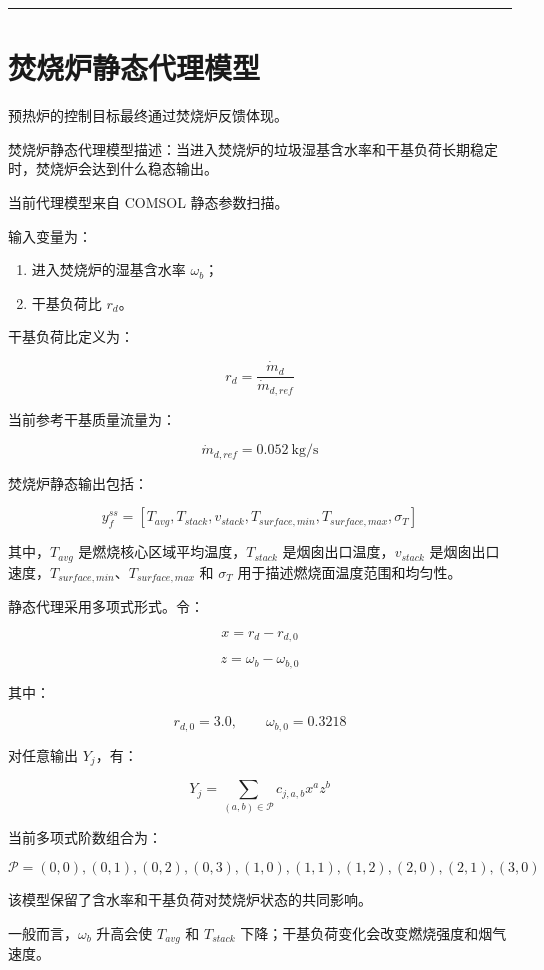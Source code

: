 \documentclass[UTF8,openany,zihao=-4,oneside]{ctexbook}
\providecommand{\tightlist}{\setlength{\itemsep}{0pt}\setlength{\parskip}{0pt}}
\newcommand{\manualdivider}{\par\vspace{0.6em}\noindent\textcolor{FGLine}{\rule{\linewidth}{0.7pt}}\vspace{0.6em}\par}
\begin{document}
\manualdivider

\section{焚烧炉静态代理模型}\label{ux711aux70e7ux7089ux9759ux6001ux4ee3ux7406ux6a21ux578b}

预热炉的控制目标最终通过焚烧炉反馈体现。

焚烧炉静态代理模型描述：当进入焚烧炉的垃圾湿基含水率和干基负荷长期稳定时，焚烧炉会达到什么稳态输出。

当前代理模型来自 COMSOL 静态参数扫描。

输入变量为：

\begin{enumerate}
\def\labelenumi{\arabic{enumi}.}
\tightlist
\item
  进入焚烧炉的湿基含水率 \(\omega_b\)；
\item
  干基负荷比 \(r_d\)。
\end{enumerate}

干基负荷比定义为：

\[
r_d=\frac{\dot m_d}{\dot m_{d,ref}}
\]

当前参考干基质量流量为：

\[
\dot m_{d,ref}=0.052\ \mathrm{kg/s}
\]

焚烧炉静态输出包括：

\[
y_f^{ss}=\left[T_{avg},T_{stack},v_{stack},T_{surface,min},T_{surface,max},\sigma_T\right]
\]

其中，\(T_{avg}\) 是燃烧核心区域平均温度，\(T_{stack}\) 是烟囱出口温度，\(v_{stack}\) 是烟囱出口速度，\(T_{surface,min}\)、\(T_{surface,max}\) 和 \(\sigma_T\) 用于描述燃烧面温度范围和均匀性。

静态代理采用多项式形式。令：

\[
x=r_d-r_{d,0}
\]

\[
z=\omega_b-\omega_{b,0}
\]

其中：

\[
r_{d,0}=3.0,
\qquad \omega_{b,0}=0.3218
\]

对任意输出 \(Y_j\)，有：

\[
Y_j=\sum_{(a,b)\in\mathcal P}c_{j,a,b}x^az^b
\]

当前多项式阶数组合为：

\[
\mathcal P={(0,0),(0,1),(0,2),(0,3),(1,0),(1,1),(1,2),(2,0),(2,1),(3,0)}
\]

该模型保留了含水率和干基负荷对焚烧炉状态的共同影响。

一般而言，\(\omega_b\) 升高会使 \(T_{avg}\) 和 \(T_{stack}\) 下降；干基负荷变化会改变燃烧强度和烟气速度。
\end{document}
